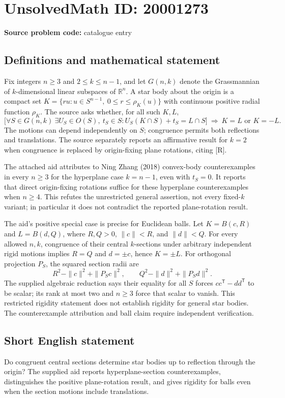 \documentclass[11pt]{article}
\newcommand{\R}{\mathbb{R}}
\begin{document}
\section*{UnsolvedMath ID: 20001273}
\textbf{Source problem code:} catalogue entry
\subsection{Definitions and mathematical statement}
Fix integers $n\geq3$ and $2\leq k\leq n-1$, and let $G(n,k)$ denote the Grassmannian of $k$-dimensional linear subspaces of $\R^n$. A star body about the origin is a compact set $K=\{ru:u\in S^{n-1},\ 0\leq r\leq\rho_K(u)\}$ with continuous positive radial function $\rho_K$. The source asks whether, for all such $K,L$,
\[
 \bigl[\forall S\in G(n,k)\ \exists U_S\in O(S),\ t_S\in S:
 U_S(K\cap S)+t_S=L\cap S\bigr]
 \ \Longrightarrow\ K=L\text{ or }K=-L.
\]
The motions can depend independently on $S$; congruence permits both reflections and translations. The source separately reports an affirmative result for $k=2$ when congruence is replaced by origin-fixing plane rotations, citing [R].

The attached aid attributes to Ning Zhang (2018) convex-body counterexamples in every $n\geq3$ for the hyperplane case $k=n-1$, even with $t_S=0$. It reports that direct origin-fixing rotations suffice for these hyperplane counterexamples when $n\geq4$. This refutes the unrestricted general assertion, not every fixed-$k$ variant; in particular it does not contradict the reported plane-rotation result.

The aid's positive special case is precise for Euclidean balls. Let $K=B(c,R)$ and $L=B(d,Q)$, where $R,Q>0$, $\|c\|<R$, and $\|d\|<Q$. For every allowed $n,k$, congruence of their central $k$-sections under arbitrary independent rigid motions implies $R=Q$ and $d=\pm c$, hence $K=\pm L$. For orthogonal projection $P_S$, the squared section radii are
\[
 R^2-\|c\|^2+\|P_Sc\|^2,\qquad
 Q^2-\|d\|^2+\|P_Sd\|^2.
\]
The supplied algebraic reduction says their equality for all $S$ forces $cc^{\mathsf T}-dd^{\mathsf T}$ to be scalar; its rank at most two and $n\geq3$ force that scalar to vanish. This restricted rigidity statement does not establish rigidity for general star bodies. The counterexample attribution and ball claim require independent verification.
\subsection{Short English statement}
Do congruent central sections determine star bodies up to reflection through the origin? The supplied aid reports hyperplane-section counterexamples, distinguishes the positive plane-rotation result, and gives rigidity for balls even when the section motions include translations.
\end{document}
